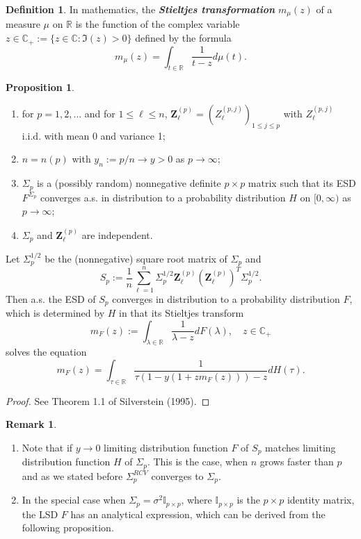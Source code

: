 \documentclass[a4paper,11pt]{article}
\theoremstyle{plain}
\theoremstyle{definition}
\newtheorem{defn}[thm]{Definition}
\newtheorem{rmrk}[thm]{Remark}
\newtheorem{prps}[thm]{Proposition}
\newcommand{\MR}{\mathbb{R}}
\newcommand{\define}[1]{\textit{\textbf{#1}}}
\begin{document}
	\begin{defn}
		In mathematics, the \define{Stieltjes transformation} $m_\mu(z)$ of a measure $\mu$ on $\MR$ is the function of the complex variable $z \in \mathbb{C}_+ := \{ z \in \mathbb{C} : \Im(z)>0 \}$ defined by the formula
		\[  
		m_\mu(z) = \int_{t \in \MR} \frac{1}{t - z} d\mu(t).
		\]
	\end{defn}
	
	\begin{prps}\label{MP law} \
		\begin{enumerate}
			\item for $p = 1, 2, \dots$ and for $1 \leq \ell \leq n$, $\mathbf{Z}_\ell^{(p)} = (Z_\ell^{(p,j)})_{1 \leq j \leq p}$ with $Z_\ell^{(p,j)}$ i.i.d. with mean 0 and variance 1;
			\item $n = n(p)$ with $y_n := p/n \rightarrow y > 0$ as $p \rightarrow \infty$;
			\item $\Sigma_p$ is a (possibly random) nonnegative definite $p \times p$ matrix such that its ESD $F^{\Sigma_p}$ converges a.s. in distribution to a probability distribution $H$ on $[0,\infty)$ as $p \rightarrow \infty$;
			\item $\Sigma_p$ and $\mathbf{Z}_\ell^{(p)}$ are independent.
		\end{enumerate}
		Let $\Sigma_p^{1/2}$ be the (nonnegative) square root matrix of $\Sigma_p$ and 
		\[S_p:= \frac{1}{n} \sum_{\ell=1}^{n} \Sigma_p^{1/2} \mathbf{Z}_\ell^{(p)}(\mathbf{Z}_\ell^{(p)})^T \Sigma_p^{1/2}.\]
		Then a.s. the ESD of $S_p$ converges in distribution to a probability distribution $F$, which is determined by $H$ in that its Stieltjes transform
		\[ m_F(z):=\int_{\lambda \in \MR} \frac{1}{\lambda - z} dF(\lambda), \quad z \in \mathbb{C}_+ \]
		solves the equation
		\begin{equation}
		m_F(z) = \int_{\tau \in \MR} \frac{1}{\tau (1-y(1+zm_F(z))) - z } dH(\tau).
		\end{equation}
	\end{prps}
	\begin{proof}
		 See Theorem 1.1 of Silverstein (1995).
	\end{proof}
	
	\begin{rmrk} \
		\begin{enumerate}
			\item Note that if $y \rightarrow 0$ limiting distribution function $F$ of $S_p$ matches limiting distribution function $H$ of $\Sigma_p$. This is the case, when $n$ grows faster than $p$ and as we stated before $\Sigma_p^{RCV}$ converges to $\Sigma_p$. 
			\item In the special case when $\Sigma_p = \sigma^2 \mathbb{I}_{p \times p}$, where $\mathbb{I}_{p \times p}$ is the $p \times p$ identity matrix, the LSD $F$ has an analytical expression, which can be derived from the following proposition.
		\end{enumerate}
	\end{rmrk}
	
\end{document}
